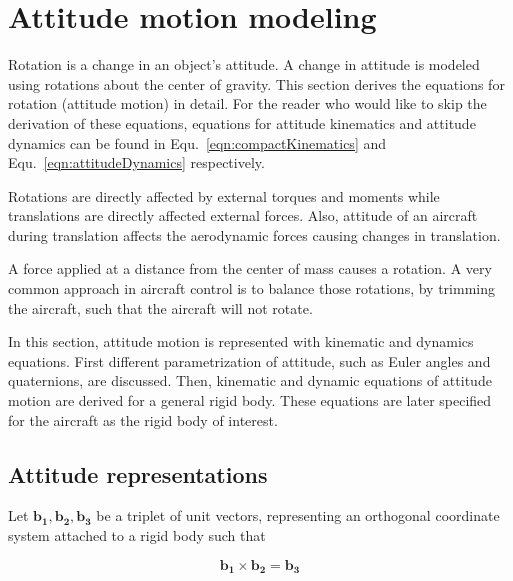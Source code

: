   
\section{Attitude motion modeling}

Rotation is a change in an object's attitude. 
A change in attitude is modeled using rotations about the center of gravity.  
This section derives the equations for rotation (attitude motion) in detail. 
For the reader who would like to skip the derivation of these equations, equations for attitude kinematics and attitude dynamics can be found in Equ.~\ref{eqn:compactKinematics} and Equ.~\ref{eqn:attitudeDynamics} respectively.

Rotations are directly affected by external torques and moments while translations are directly affected external forces. 
Also, attitude of an aircraft during translation affects the aerodynamic forces causing changes in translation.

A force applied at a distance from the center of mass causes a rotation.
A very common approach in aircraft control is to balance those rotations, by trimming the aircraft, such that the aircraft will not rotate.

In this section, attitude motion is represented with kinematic and dynamics equations. 
First different parametrization of attitude, such as Euler angles and quaternions, are discussed. 
Then, kinematic and dynamic equations of attitude motion are derived for a general rigid body. 
These equations are later specified for the aircraft as the rigid body of interest. 

\subsection{Attitude representations}
Let $\bm{b_1}, \bm{b_2}, \bm{b_3}$ be a triplet of unit vectors, representing an orthogonal coordinate system attached to a rigid body such that

\begin{equation}
\label{eqn:unitVectors}
\bm{b_1}\times \bm{b_2}= \bm{b_3}
\end{equation}

